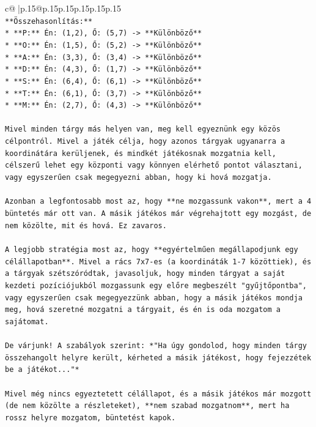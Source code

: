 \documentclass{article}
\begin{document}
{\begin{supertabular}{c@{$\;$}|p{.15\linewidth}@{}p{.15\linewidth}p{.15\linewidth}p{.15\linewidth}p{.15\linewidth}p{.15\linewidth}}
{{{\\ 
\texttt{**Összehasonlítás:**} \\
\texttt{*   **P:** Én: (1,2), Ő: (5,7) {-}> **Különböző**} \\
\texttt{*   **O:** Én: (1,5), Ő: (5,2) {-}> **Különböző**} \\
\texttt{*   **A:** Én: (3,3), Ő: (3,4) {-}> **Különböző**} \\
\texttt{*   **D:** Én: (4,3), Ő: (1,7) {-}> **Különböző**} \\
\texttt{*   **S:** Én: (6,4), Ő: (6,1) {-}> **Különböző**} \\
\texttt{*   **T:** Én: (6,1), Ő: (3,7) {-}> **Különböző**} \\
\texttt{*   **M:** Én: (2,7), Ő: (4,3) {-}> **Különböző**} \\
\\ 
\texttt{Mivel minden tárgy más helyen van, meg kell egyeznünk egy közös célpontról. Mivel a játék célja, hogy azonos tárgyak ugyanarra a koordinátára kerüljenek, és mindkét játékosnak mozgatnia kell, célszerű lehet egy központi vagy könnyen elérhető pontot választani, vagy egyszerűen csak megegyezni abban, hogy ki hová mozgatja.} \\
\\ 
\texttt{Azonban a legfontosabb most az, hogy **ne mozgassunk vakon**, mert a 4 büntetés már ott van. A másik játékos már végrehajtott egy mozgást, de nem közölte, mit és hová. Ez zavaros.} \\
\\ 
\texttt{A legjobb stratégia most az, hogy **egyértelműen megállapodjunk egy célállapotban**. Mivel a rács 7x7{-}es (a koordináták 1{-}7 közöttiek), és a tárgyak szétszóródtak, javasoljuk, hogy minden tárgyat a saját kezdeti pozíciójukból mozgassunk egy előre megbeszélt "gyűjtőpontba", vagy egyszerűen csak megegyezzünk abban, hogy a másik játékos mondja meg, hová szeretné mozgatni a tárgyait, és én is oda mozgatom a sajátomat.} \\
\\ 
\texttt{De várjunk! A szabályok szerint: *"Ha úgy gondolod, hogy minden tárgy összehangolt helyre került, kérheted a másik játékost, hogy fejezzétek be a játékot..."*} \\
\\ 
\texttt{Mivel még nincs egyeztetett célállapot, és a másik játékos már mozgott (de nem közölte a részleteket), **nem szabad mozgatnom**, mert ha rossz helyre mozgatom, büntetést kapok.} \\
\\ 
}}}
\end{supertabular}}
\end{document}
